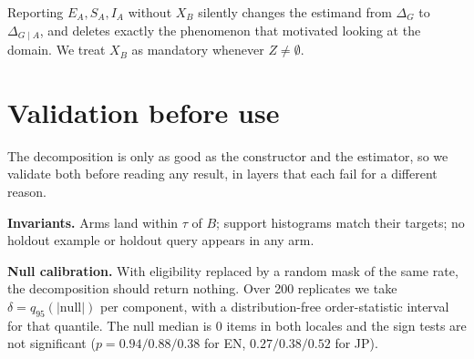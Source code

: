 \documentclass[10pt,twocolumn]{article}
\begin{document}
Reporting $E_A,S_A,I_A$ without $X_B$ silently changes the estimand from $\Delta_G$ to
$\Delta_{G\mid A}$, and deletes exactly the phenomenon that motivated looking at the domain. We
treat $X_B$ as mandatory whenever $Z\neq\emptyset$.

\section{Validation before use}
\label{sec:validation}

The decomposition is only as good as the constructor and the estimator, so we validate both
before reading any result, in layers that each fail for a different reason.

\textbf{Invariants.} Arms land within $\tau$ of $B$; support histograms match their targets; no
holdout example or holdout query appears in any arm.

\textbf{Null calibration.} With eligibility replaced by a random mask of the same rate, the
decomposition should return nothing. Over 200 replicates we take
$\delta=q_{95}(|\text{null}|)$ per component, with a distribution-free order-statistic interval
for that quantile. The null median is $0$ items in both locales and the sign tests are not
significant ($p=0.94/0.88/0.38$ for EN, $0.27/0.38/0.52$ for JP).
\end{document}
